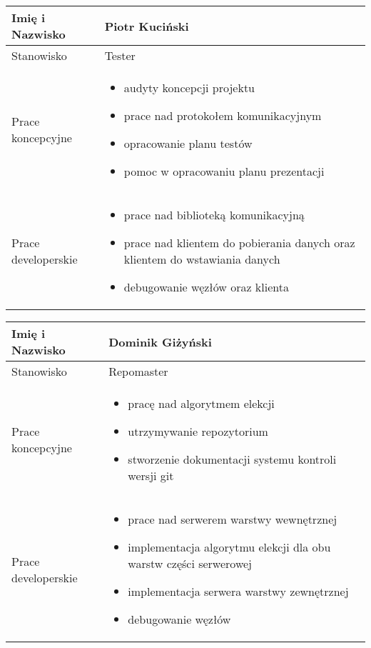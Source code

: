 \begin{longtable}{| p{} | p{} |}
\hline
Imię i Nazwisko & Piotr Kuciński \\ \hline
Stanowisko & Tester \\ \hline
Prace koncepcyjne & \begin{itemize} 
\item audyty koncepcji projektu 
\item prace nad protokołem komunikacyjnym
\item opracowanie planu testów
\item pomoc w opracowaniu planu prezentacji \end{itemize} \\ \hline
Prace developerskie & \begin{itemize}
\item prace nad biblioteką komunikacyjną
\item prace nad klientem do pobierania danych oraz klientem do wstawiania danych
\item debugowanie węzłów oraz klienta
\end{itemize} \\ \hline
\end{longtable}

\begin{longtable}{| p{} | p{} |}
\hline
Imię i Nazwisko & Dominik Giżyński \\ \hline
Stanowisko & Repomaster \\ \hline
Prace koncepcyjne & \begin{itemize} 
\item pracę nad algorytmem elekcji
\item utrzymywanie repozytorium
\item stworzenie dokumentacji systemu kontroli wersji git \end{itemize} \\ \hline
Prace developerskie & \begin{itemize}
\item prace nad serwerem warstwy wewnętrznej
\item implementacja algorytmu elekcji dla obu warstw części serwerowej
\item implementacja serwera warstwy zewnętrznej
\item debugowanie węzłów
\end{itemize} \\ \hline
\end{longtable}

